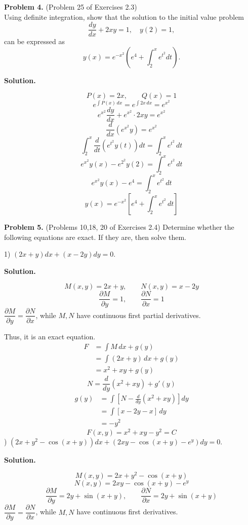 \documentclass[11pt,a4paper]{article}
\begin{document}
\bigskip
\noindent
{\bf Problem 4.}
(Problem 25 of Exercises 2.3)  \\
\noindent
  Using definite integration, show that the solution to the initial value problem
 $$
 \dfrac{dy}{dx} + 2xy =1,  \quad y(2)=1,
 $$
 can be expressed as
 $$
 y(x) = e^{-x^2} \left( e^4 + \int_2^x e^{t^2} dt \right) .
 $$
\medskip
\par\noindent
\textbf{Solution.}\par
\[
P(x)=2x,\qquad Q(x)=1
\]
\[
e^{\int P(x)\,dx}=e^{\int 2x\,dx}=e^{x^2}
\]
\[
e^{x^2}\frac{dy}{dx}+e^{x^2}\cdot 2xy=e^{x^2}
\]
\[
\frac{d}{dx}\left(e^{x^2}y\right)=e^{x^2}
\]
\[
\int_2^x\frac{d}{dt}\left(e^{t^2}y(t)\right)dt
=\int_2^x e^{t^2}\,dt
\]
\[
e^{x^2}y(x)-e^{2^2}y(2)=\int_2^x e^{t^2}\,dt
\]
\[
e^{x^2}y(x)-e^4=\int_2^x e^{t^2}\,dt
\]
\[
y(x)=e^{-x^2}\left[e^4+\int_2^x e^{t^2}\,dt\right]
\]
\medskip




\bigskip
\noindent
{\bf Problem 5.}  (Problems 10,18, 20 of Exercises 2.4)
Determine whether the following equations are exact. If they are, then solve them.

1) $(2x+y)dx+(x-2y)dy=0$.
\medskip
\par\noindent
\textbf{Solution.}\par
\[
M(x,y)=2x+y,\qquad N(x,y)=x-2y
\]
\[
\frac{\partial M}{\partial y}=1,\qquad
\frac{\partial N}{\partial x}=1
\]
$\dfrac{\partial M}{\partial y}=\dfrac{\partial N}{\partial x}$,
while $M,N$ have continuous first partial derivatives.

Thus, it is an exact equation.
\[
\begin{aligned}
F&=\int M\,dx+g(y)\\
 &=\int(2x+y)\,dx+g(y)\\
 &=x^2+xy+g(y)
\end{aligned}
\]
\[
N=\frac{d}{dy}(x^2+xy)+g'(y)
\]
\[
\begin{aligned}
g(y)&=\int\left[N-\frac{d}{dy}(x^2+xy)\right]dy\\
    &=\int[x-2y-x]\,dy\\
    &=-y^2
\end{aligned}
\]
\[
F(x,y)=x^2+xy-y^2=C
\]
) $(2x+y^2-\cos (x+y))dx+(2xy-\cos (x+y)-e^y)dy=0$.
\medskip
\par\noindent
\textbf{Solution.}\par
\[
M(x,y)=2x+y^2-\cos(x+y)
\]
\[
N(x,y)=2xy-\cos(x+y)-e^y
\]
\[
\frac{\partial M}{\partial y}=2y+\sin(x+y),\qquad
\frac{\partial N}{\partial x}=2y+\sin(x+y)
\]
$\dfrac{\partial M}{\partial y}=\dfrac{\partial N}{\partial x}$,
while $M,N$ have continuous first derivatives.
\end{document}
